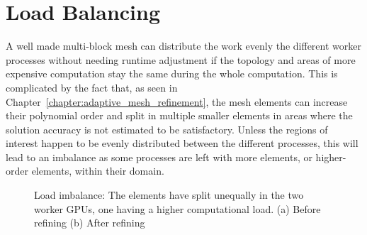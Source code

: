 \chapter{Load Balancing} \label{chapter:load_balancing}

A well made multi-block mesh can distribute the work evenly the different worker processes without
needing runtime adjustment if the topology and areas of more expensive computation stay the same
during the whole computation. This is complicated by the fact that, as seen in
Chapter~\ref{chapter:adaptive_mesh_refinement}, the mesh elements can increase their polynomial
order and split in multiple smaller elements in areas where the solution accuracy is not estimated
to be satisfactory. Unless the regions of interest happen to be evenly distributed between the
different processes, this will lead to an imbalance as some processes are left with more elements,
or higher-order elements, within their domain.

\begin{figure}[H]
	\centering
	\hfill
	\caption{Load imbalance: The elements have split unequally in the two worker GPUs, one having a higher computational load. (a) Before refining (b) After refining}
	\label{fig:load_imbalance_lb}
\end{figure}

